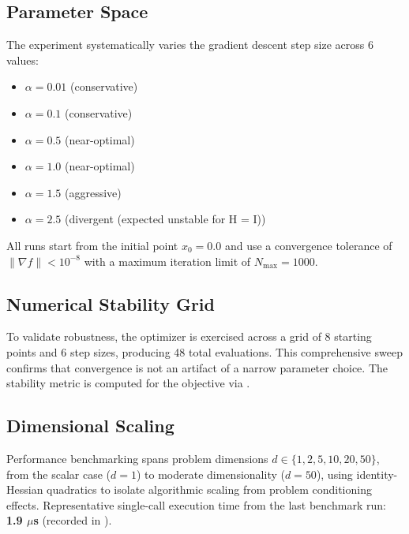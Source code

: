 \documentclass[
]{article}
\providecommand{\tightlist}{%
  \setlength{\itemsep}{0pt}\setlength{\parskip}{0pt}}
\begin{document}
\subsection{Parameter Space}\label{parameter-space}

The experiment systematically varies the gradient descent step size
across 6 values:

\begin{itemize}
\tightlist
\item
  \(\alpha = 0.01\) (conservative)
\item
  \(\alpha = 0.1\) (conservative)
\item
  \(\alpha = 0.5\) (near-optimal)
\item
  \(\alpha = 1.0\) (near-optimal)
\item
  \(\alpha = 1.5\) (aggressive)
\item
  \(\alpha = 2.5\) (divergent (expected unstable for H = I))
\end{itemize}

All runs start from the initial point \(x_0 = 0.0\) and use a
convergence tolerance of \(\|{\nabla f}\| < 10^{-8}\) with a maximum
iteration limit of \(N_{\max} = 1000\).

\subsection{Numerical Stability Grid}\label{numerical-stability-grid}

To validate robustness, the optimizer is exercised across a grid of 8
starting points and 6 step sizes, producing 48 total evaluations. This
comprehensive sweep confirms that convergence is not an artifact of a
narrow parameter choice. The stability metric is computed for the
 objective via
.

\subsection{Dimensional Scaling}\label{dimensional-scaling}

Performance benchmarking spans problem dimensions
\(d \in \{1, 2, 5, 10, 20, 50\}\), from the scalar case (\(d = 1\)) to
moderate dimensionality (\(d = 50\)), using identity-Hessian quadratics
to isolate algorithmic scaling from problem conditioning effects.
Representative single-call execution time from the last benchmark run:
\textbf{1.9 \texorpdfstring{\ensuremath{\mu}}{mu}s} (recorded in
).
\end{document}
